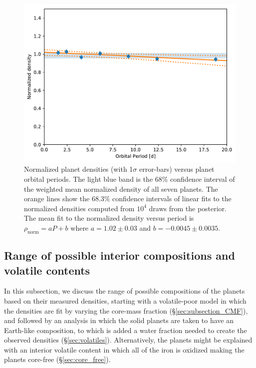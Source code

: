 \documentclass[twocolumn]{aastex63}
\begin{document}
\begin{figure}
    \centering
    \includegraphics[width=\hsize]{figures/Norm_dens_vs_period.pdf}
    \caption{Normalized planet densities (with 1$\sigma$ error-bars) versus planet orbital periods. The light blue band is the 68\% confidence interval of the weighted mean normalized density of all seven planets.  The orange lines show the 68.3\% confidence intervals of linear fits to the normalized densities computed from $10^4$
     draws from the posterior.  The mean fit to the normalized density versus period is $\rho_\mathrm{norm}= a P + b$ where $a= 1.02\pm 0.03$ and $b=-0.0045\pm0.0035$.}
    \label{fig:norm_density_vs_period}
\end{figure}


\subsection{Range of possible interior compositions and volatile contents}  \label{sec:interior_compositions}

In this subsection, we discuss the range of possible compositions of the planets based on their measured densities,
starting with a volatile-poor model in which the densities are fit by varying the core-mass fraction (\S \ref{sec:subsection_CMF}),
and followed by an analysis in which the solid planets are taken to have an Earth-like composition, to which is added a water fraction needed to create the observed densities (\S \ref{sec:volatiles}). %
Alternatively, the planets might be explained with an interior volatile content in which all of the iron is oxidized making the planets core-free (\S \ref{sec:core_free}).
\end{document}
